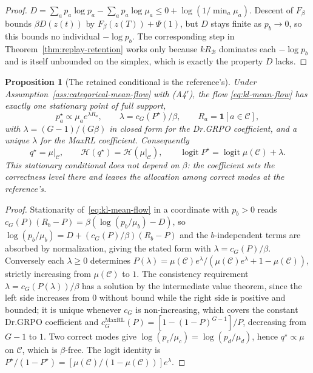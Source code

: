 \documentclass{article}
\newcommand{\1}{\mathbf 1}
\newtheorem{proposition}[lemma]{Proposition}
\theoremstyle{remark}
\theoremstyle{definition}
\theoremstyle{plain}
\begin{document}
\begin{proof}
$D=\sum_ap_a\log p_a-\sum_ap_a\log\mu_a\le0+\log(1/\min_a\mu_a)$. Descent of
$F_\beta$ bounds $\beta D(z(t))$ by $F_\beta(z(T))+\Psi(1)$, but $D$ stays
finite as $p_b\to0$, so this bounds no individual $-\log p_b$. The
corresponding step in Theorem~\ref{thm:replay-retention} works only because
$kR_{\mathcal B}$ dominates each $-\log p_b$ and is itself unbounded on the
simplex, which is exactly the property $D$ lacks.
\end{proof}

\begin{proposition}[The retained conditional is the reference's]
\label{prop:kl-stationary}
Under Assumption~\ref{ass:categorical-mean-flow} with (A4$'$), the flow
\eqref{eq:kl-mean-flow} has exactly one stationary point of full support,
\[
  p^\star_a\propto\mu_ae^{\lambda R_a},
  \qquad
  \lambda=c_G(P^\star)/\beta,
  \qquad
  R_a=\1[a\in\mathcal C],
\]
with $\lambda=(G-1)/(G\beta)$ in closed form for the Dr.GRPO coefficient, and
a unique $\lambda$ for the MaxRL coefficient. Consequently
\[
  q^\star=\mu|_{\mathcal C},
  \qquad
  \mathcal H(q^\star)=\mathcal H(\mu|_{\mathcal C}),
  \qquad
  \operatorname{logit}P^\star=\operatorname{logit}\mu(\mathcal C)+\lambda .
\]
This stationary conditional does not depend on $\beta$: the coefficient sets
the correctness level there and leaves the allocation among correct modes at
the reference's.
\end{proposition}

\begin{proof}
Stationarity of~\eqref{eq:kl-mean-flow} in a coordinate with $p_b>0$ reads
$c_G(P)(R_b-P)=\beta(\log(p_b/\mu_b)-D)$, so
$\log(p_b/\mu_b)=D+(c_G(P)/\beta)(R_b-P)$ and the $b$-independent terms are
absorbed by normalization, giving the stated form with $\lambda=c_G(P)/\beta$.
Conversely each $\lambda\ge0$ determines
$P(\lambda)=\mu(\mathcal C)e^\lambda/(\mu(\mathcal C)e^\lambda+1-\mu(\mathcal C))$,
strictly increasing from $\mu(\mathcal C)$ to $1$. The consistency requirement
$\lambda=c_G(P(\lambda))/\beta$ has a solution by the intermediate value
theorem, since the left side increases from $0$ without bound while the right
side is positive and bounded; it is unique whenever $c_G$ is non-increasing,
which covers the constant Dr.GRPO coefficient and
$c_G^{\mathrm{MaxRL}}(P)=[1-(1-P)^{G-1}]/P$, decreasing from $G-1$ to $1$.
Two correct modes give $\log(p_c/\mu_c)=\log(p_d/\mu_d)$, hence
$q^\star\propto\mu$ on $\mathcal C$, which is $\beta$-free. The logit identity
is $P^\star/(1-P^\star)=[\mu(\mathcal C)/(1-\mu(\mathcal C))]e^\lambda$.
\end{proof}
\end{document}
